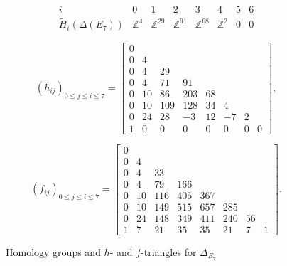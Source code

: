 \documentclass[11pt]{amsart}
\def\ZZ{\mathbb{Z}}
\theoremstyle{plain}
\numberwithin{lemma}{\DefaultNumberTheoremWithin}
\numberwithin{theorem}{\DefaultNumberTheoremWithin}
\numberwithin{corollary}{\DefaultNumberTheoremWithin}
\numberwithin{proposition}{\DefaultNumberTheoremWithin}
\numberwithin{conjecture}{\DefaultNumberTheoremWithin}
\theoremstyle{definition}
\numberwithin{definition}{\DefaultNumberTheoremWithin}
\numberwithin{question}{\DefaultNumberTheoremWithin}
\numberwithin{problem}{\DefaultNumberTheoremWithin}
\theoremstyle{remark}
\numberwithin{remark}{\DefaultNumberTheoremWithin}
\numberwithin{example}{\DefaultNumberTheoremWithin}
\numberwithin{claim}{\DefaultNumberTheoremWithin}
\begin{document}
\begin{figure}[H]
{\small
$$\begin{array}{c|ccccccc} i & 0 & 1 & 2 & 3 & 4 & 5 & 6\\
\hline
\widetilde{H}_i(\Delta(E_7)) & \ZZ^4 & \ZZ^{29} & \ZZ^{91} & \ZZ^{68} & \ZZ^2 & 0 & 0
\end{array}$$
 

 $$(h_{ij})_{0 \leq j \leq i \leq 7}  = \left[\begin{array}{cccccccc}
  0 &    &     &     &     &     &   & \\ 
  0 & 4  &     &     &     &     &   & \\
  0 & 4  & 29  &     &     &     &   & \\
  0 & 4  & 71  & 91  &     &     &   & \\
  0 & 10 & 86  & 203 & 68  &     &   & \\
  0 & 10 & 109 & 128 & 34 & 4 &   & \\
  0 & 24 & 28 & -3 & 12 & -7 & 2& \\
  1 & 0  & 0  & 0 & 0 & 0 & 0 & 0 
  \end{array}\right],
 $$
 
 $$(f_{ij})_{0 \leq j \leq i \leq 7}  = \left[
 \begin{array}{cccccccc}
  0 &    &     &     &     &     &   & \\ 
  0 & 4  &     &     &     &     &   & \\
  0 & 4  & 33  &     &     &     &   & \\
  0 & 4  & 79  & 166 &     &     &   & \\
  0 & 10 & 116 & 405 & 367 &     &   & \\
  0 & 10 & 149 & 515 & 657 & 285 &   & \\
  0 & 24 & 148 & 349 & 411 & 240 & 56& \\
  1 & 7  & 21  & 35 & 35 & 21 & 7 & 1 
  \end{array}\right].$$}
 \caption{Homology groups and $h$- and $f$-triangles for $\Delta_{E_7}$}
\label{fig:e7}
\end{figure}
\end{document}
